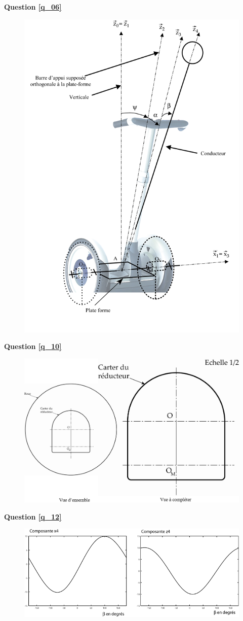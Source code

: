 \documentclass[10pt,fleqn]{article} %
\begin{document}
\textbf{Question \ref{q_06}}
\begin{figure}[H]
\centering
\includegraphics[width=.7\linewidth]{dr_01.png}
\end{figure}


\newpage


\textbf{Question \ref{q_10}}
\begin{figure}[H]
\centering
\includegraphics[width=.9\linewidth]{dr_02}
\end{figure}


\textbf{Question \ref{q_12}}

\begin{figure}[H]
\centering
\includegraphics[width=.8\linewidth]{dr_03}
\end{figure}
\end{document}
